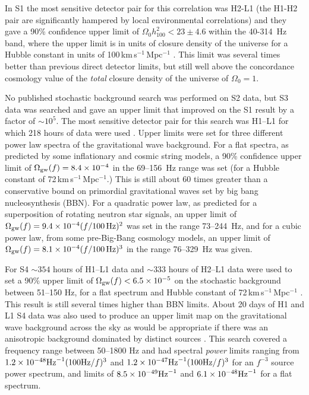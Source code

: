\documentclass{article}
\begin{document}
In S1 the most sensitive detector pair for this correlation was H2-L1 (the
H1-H2 pair are significantly hampered by local environmental correlations) and
they gave a 90\% confidence upper limit of $\Omega_0h^2_{100} < 23\pm4.6$ within
the 40-314~Hz band, where the upper limit is in units of closure density of the
universe for a Hubble constant in units of 100\,km\,s$^{-1}$\,Mpc$^{-1}$
\cite{Abbott:2004e}. This limit was several times better than previous direct
detector limits, but still well above the concordance cosmology value of the
{\it total} closure density of the universe of $\Omega_0=1$.

No published stochastic background search was performed on S2 data, but S3 data
was searched and gave an upper limit that improved on the S1 result by a factor
of $\sim10^5$. The most sensitive detector pair for this search was H1--L1 for
which 218 hours of data were used \cite{Abbott:2005h}. Upper limits were set for
three different power law spectra of the gravitational wave background. For a
flat spectra, as predicted by some inflationary and cosmic string models, a 90\%
confidence upper limit of $\Omega_{\rm gw}(f) = 8.4\times10^{-4}$ in the
69--156~Hz range was set (for a Hubble constant of
72\,km\,s$^{-1}$\,Mpc$^{-1}$.) This is still about 60 times greater than a
conservative bound on primordial gravitational waves set by big bang
nucleosynthesis (BBN). For a quadratic power law, as predicted for a
superposition of rotating neutron star signals, an upper limit of $\Omega_{\rm
gw}(f) = 9.4\times10^{-4}(f/100\,{\rm Hz})^2$ was set in the range 73--244~Hz,
and for a cubic power law, from some pre-Big-Bang cosmology models, an upper
limit of $\Omega_{\rm gw}(f) = 8.1\times10^{-4}(f/100\,{\rm Hz})^3$ in the range
76--329~Hz was given.

For S4 $\sim354$ hours of H1--L1 data and $\sim333$ hours of H2--L1 data were
used to set a 90\% upper limit of $\Omega_{\rm gw}(f) < 6.5\times10^{-5}$ on
the stochastic background between 51--150 Hz, for a flat spectrum and Hubble
constant of 72\,km\,s$^{-1}$\,Mpc$^{-1}$ \cite{Abbott:2007e}. This result is
still several times higher than BBN limits. About 20 days of H1 and L1 S4 data
was also used to produce an upper limit map on the gravitational wave background
across the sky as would be appropriate if there was an anisotropic background
dominated by distinct sources \cite{Abbott:2007f}. This search covered a
frequency range between 50--1800 Hz and had spectral {\it power} limits ranging
from $1.2\times10^{-48} {\rm Hz}^{-1} (100 {\rm Hz}/f)^3$ and $1.2\times10^{-47}
{\rm Hz}^{-1} (100 {\rm Hz}/f)^3$ for an $f^{-3}$ source power spectrum, and
limits of $8.5\times10^{-49} {\rm Hz}^{-1}$ and $6.1\times10^{-48} {\rm
Hz}^{-1}$ for a flat spectrum.
\end{document}

